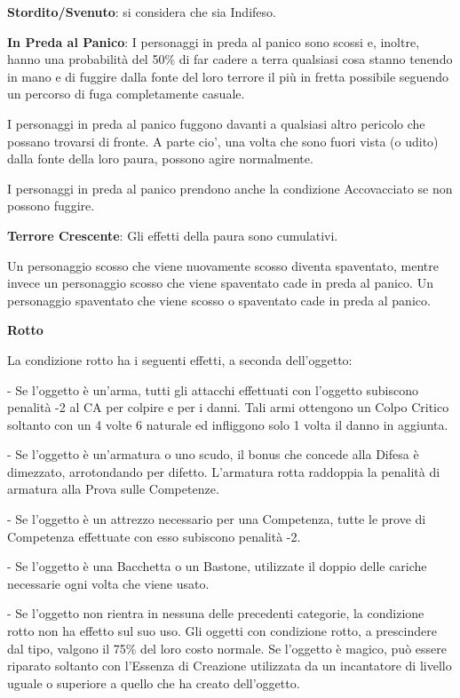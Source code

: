 \documentclass[a4paper,11pt,twoside,openany]{book}
\begin{document}
\textbf{Stordito/Svenuto}: si considera che sia Indifeso.

\textbf{In Preda al Panico}: I personaggi in preda al panico sono scossi e, inoltre, hanno una probabilità del 50\% di far cadere a terra qualsiasi cosa stanno tenendo in mano e di fuggire dalla fonte del loro terrore il più in fretta possibile seguendo un percorso di fuga completamente casuale.

I personaggi in preda al panico fuggono davanti a qualsiasi altro pericolo che possano trovarsi di fronte. A parte cio', una volta che sono fuori vista (o udito) dalla fonte della loro paura, possono agire normalmente.

I personaggi in preda al panico prendono anche la condizione Accovacciato se non possono fuggire.

\textbf{Terrore Crescente}: Gli effetti della paura sono cumulativi.

Un personaggio scosso che viene nuovamente scosso diventa spaventato, mentre invece un personaggio scosso che viene spaventato cade in preda al panico. Un personaggio spaventato che viene scosso o spaventato cade in preda al panico.

\textbf{Rotto}

La condizione rotto ha i seguenti effetti, a seconda dell'oggetto:

- Se l'oggetto è un'arma, tutti gli attacchi effettuati con l'oggetto subiscono penalità -2 al CA per colpire e per i danni. Tali armi ottengono un Colpo Critico soltanto con un 4 volte 6 naturale ed infliggono solo 1 volta il danno in aggiunta.

- Se l'oggetto è un'armatura o uno scudo, il bonus che concede alla Difesa è dimezzato, arrotondando per difetto. L'armatura rotta raddoppia la penalità di armatura alla Prova sulle Competenze.

- Se l'oggetto è un attrezzo necessario per una Competenza, tutte le prove di Competenza effettuate con esso subiscono penalità -2.

- Se l'oggetto è una Bacchetta o un Bastone, utilizzate il doppio delle cariche necessarie ogni volta che viene usato.

- Se l'oggetto non rientra in nessuna delle precedenti categorie, la condizione rotto non ha effetto sul suo uso. Gli oggetti con condizione rotto, a prescindere dal tipo, valgono il 75\% del loro costo normale. Se l'oggetto è magico, può essere riparato soltanto con l'Essenza di Creazione utilizzata da un incantatore di livello uguale o superiore a quello che ha creato dell'oggetto.
\end{document}
